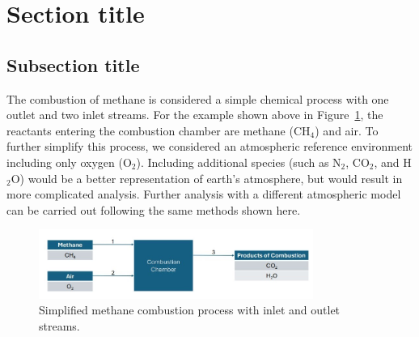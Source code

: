 \documentclass[energies,article,submit,pdftex,moreauthors]{Definitions/mdpi}
\begin{document}

\appendixstart
\appendix
\section[\appendixname~\thesection]{Section title}
\subsection[\appendixname~\thesubsection]{Subsection title}



The combustion of methane is considered a simple chemical process
with one outlet and two inlet streams.
For the example shown above in Figure~\ref{fig:combustion_process},
the reactants entering the combustion chamber are methane (CH$_4$) and air.
To further simplify this process,
we considered an atmospheric reference environment
including only oxygen (O$_2$).
Including additional species
(such as N$_2$, CO$_2$, and H$_2$O) would be a better representation
of earth's atmosphere,
but would result in more complicated analysis.
Further analysis with a different atmospheric model
can be carried out following the same methods shown here.

\begin{figure}
\centering
\includegraphics[width=0.8\textwidth]{images/combustion1}
\caption{Simplified methane combustion process with inlet and outlet streams.}
\label{fig:combustion_process}
\end{figure}
\end{document}
